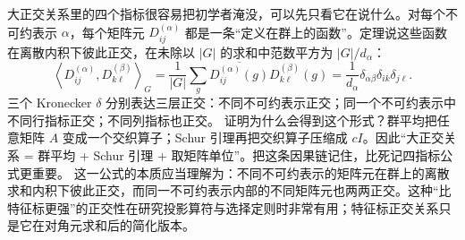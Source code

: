 大正交关系里的四个指标很容易把初学者淹没，可以先只看它在说什么。对每个不可约表示 $\alpha$，每个矩阵元 $D^{(\alpha)}_{ij}$ 都是一条“定义在群上的函数”。定理说这些函数在离散内积下彼此正交，在未除以 $|G|$ 的求和中范数平方为 $|G|/d_\alpha$：
\[
\left\langle D^{(\alpha)}_{ij},D^{(\beta)}_{k\ell}\right\rangle_G
=\frac1{|G|}\sum_g \overline{D^{(\alpha)}_{ij}(g)}D^{(\beta)}_{k\ell}(g)
=\frac1{d_\alpha}\delta_{\alpha\beta}\delta_{ik}\delta_{j\ell}.
\]
三个 Kronecker \(\delta\) 分别表达三层正交：不同不可约表示正交；同一个不可约表示中不同行指标正交；不同列指标也正交。
证明为什么会得到这个形式？群平均把任意矩阵 $A$ 变成一个交织算子；Schur 引理再把交织算子压缩成 $cI$。因此“大正交关系 = 群平均 + Schur 引理 + 取矩阵单位”。把这条因果链记住，比死记四指标公式更重要。
这一公式的本质应当理解为：不同不可约表示的矩阵元在群上的离散求和内积下彼此正交，而同一不可约表示内部的不同矩阵元也两两正交。这种“比特征标更强”的正交性在研究投影算符与选择定则时非常有用；特征标正交关系只是它在对角元求和后的简化版本。
